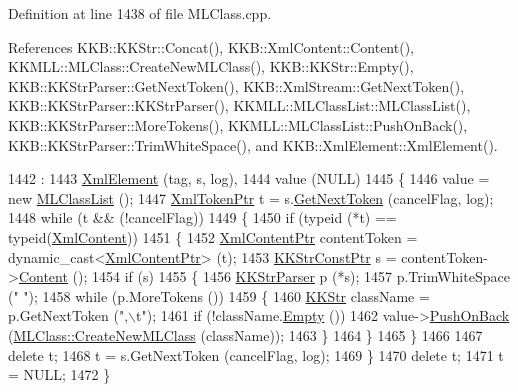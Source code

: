 Definition at line 1438 of file M\+L\+Class.\+cpp.



References K\+K\+B\+::\+K\+K\+Str\+::\+Concat(), K\+K\+B\+::\+Xml\+Content\+::\+Content(), K\+K\+M\+L\+L\+::\+M\+L\+Class\+::\+Create\+New\+M\+L\+Class(), K\+K\+B\+::\+K\+K\+Str\+::\+Empty(), K\+K\+B\+::\+K\+K\+Str\+Parser\+::\+Get\+Next\+Token(), K\+K\+B\+::\+Xml\+Stream\+::\+Get\+Next\+Token(), K\+K\+B\+::\+K\+K\+Str\+Parser\+::\+K\+K\+Str\+Parser(), K\+K\+M\+L\+L\+::\+M\+L\+Class\+List\+::\+M\+L\+Class\+List(), K\+K\+B\+::\+K\+K\+Str\+Parser\+::\+More\+Tokens(), K\+K\+M\+L\+L\+::\+M\+L\+Class\+List\+::\+Push\+On\+Back(), K\+K\+B\+::\+K\+K\+Str\+Parser\+::\+Trim\+White\+Space(), and K\+K\+B\+::\+Xml\+Element\+::\+Xml\+Element().


\begin{DoxyCode}
1442                                                       :
1443     \hyperlink{class_k_k_b_1_1_xml_element_a66317eff5bd3abcc60755756ba2887d5}{XmlElement} (tag, s, log),
1444     value (NULL)
1445 \{
1446   value = \textcolor{keyword}{new} \hyperlink{class_k_k_m_l_l_1_1_m_l_class_list}{MLClassList} ();
1447   \hyperlink{class_k_k_b_1_1_xml_token}{XmlTokenPtr} t = s.\hyperlink{class_k_k_b_1_1_xml_stream_a87cc738b05c666cf5d5c25beaab477b4}{GetNextToken} (cancelFlag, log);
1448   \textcolor{keywordflow}{while}  (t  &&  (!cancelFlag))
1449   \{
1450     \textcolor{keywordflow}{if}  (\textcolor{keyword}{typeid} (*t) == \textcolor{keyword}{typeid}(\hyperlink{class_k_k_b_1_1_xml_content}{XmlContent}))
1451     \{
1452       \hyperlink{class_k_k_b_1_1_xml_content}{XmlContentPtr}  contentToken = \textcolor{keyword}{dynamic\_cast<}\hyperlink{class_k_k_b_1_1_xml_content}{XmlContentPtr}\textcolor{keyword}{>} (t);
1453       \hyperlink{class_k_k_b_1_1_k_k_str}{KKStrConstPtr}  s = contentToken->\hyperlink{class_k_k_b_1_1_xml_content_a1d0730aae45b069e8604bef19b8c0098}{Content} ();
1454       \textcolor{keywordflow}{if}  (s)
1455       \{
1456         \hyperlink{class_k_k_b_1_1_k_k_str_parser}{KKStrParser} p (*s);
1457         p.TrimWhiteSpace (\textcolor{stringliteral}{" "});
1458         \textcolor{keywordflow}{while}  (p.MoreTokens ())
1459         \{
1460           \hyperlink{class_k_k_b_1_1_k_k_str}{KKStr} className = p.GetNextToken (\textcolor{stringliteral}{",\(\backslash\)t"});
1461           \textcolor{keywordflow}{if}  (!className.\hyperlink{class_k_k_b_1_1_k_k_str_ac69942f73fffd672ec2a6e1c410afdb6}{Empty} ())
1462             value->\hyperlink{class_k_k_m_l_l_1_1_m_l_class_list_ae46d4f51c041d7d4d544bf514c484295}{PushOnBack} (\hyperlink{class_k_k_m_l_l_1_1_m_l_class_a9fd24c617c42d89afc92414575e00e9a}{MLClass::CreateNewMLClass} (className));
1463         \}
1464       \}
1465     \}
1466 
1467     \textcolor{keyword}{delete}  t;
1468     t = s.GetNextToken (cancelFlag, log);
1469   \}
1470   \textcolor{keyword}{delete}  t;
1471   t = NULL;
1472 \}
\end{DoxyCode}
